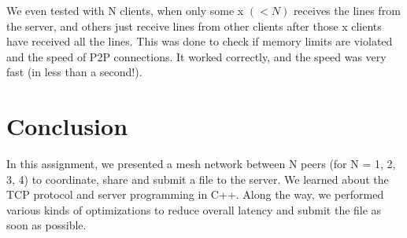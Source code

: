\documentclass[12pt]{scrartcl}
\begin{document}
We even tested with N clients, when only some x \((< N)\) receives the lines from the server, and others just receive lines from other clients after those x clients have received all the lines. This was done to check if memory limits are violated and the speed of P2P connections. It worked correctly, and the speed was very fast (in less than a second!). 

\section{Conclusion}

In this assignment, we presented a mesh network between N peers (for N = 1, 2, 3, 4) to coordinate, share and submit a file to the server. We learned about the TCP protocol and server programming in C++. Along the way, we performed various kinds of optimizations to reduce overall latency and submit the file as soon as possible.
\end{document}
